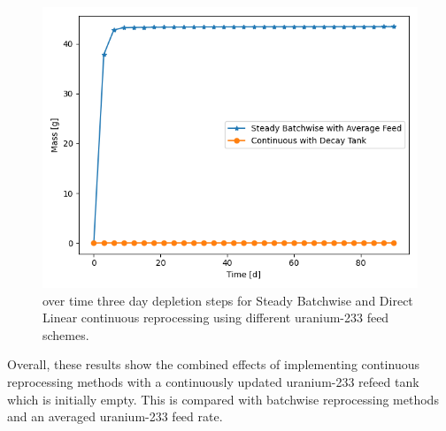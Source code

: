 \begin{figure}[H]
  \centering
  \includegraphics[scale=0.7]{images/prev-cur-xe136.png}
  \caption{ over time three day depletion steps for Steady Batchwise and Direct Linear continuous reprocessing using different uranium-233 feed schemes.}
   \label{fig:prev-cur-xe136-plot}
\end{figure}

Overall, these results show the combined effects of implementing continuous reprocessing methods with a continuously updated uranium-233 refeed tank which is initially empty. This is compared with batchwise reprocessing methods and an averaged uranium-233 feed rate.




